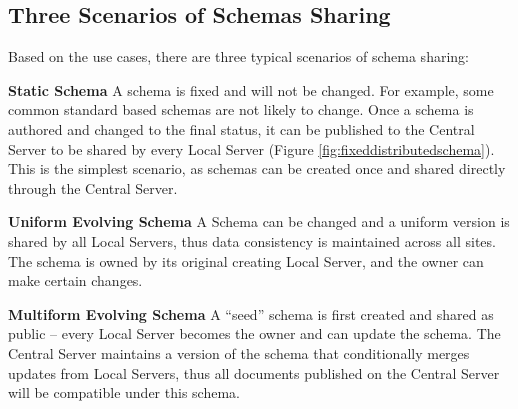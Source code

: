 \documentclass{doublecol-new}
\theoremstyle{TH}{
\newtheorem{lemma}{Lemma}
\newtheorem{theorem}[lemma]{Theorem}
\newtheorem{corrolary}[lemma]{Corrolary}
\newtheorem{conjecture}[lemma]{Conjecture}
\newtheorem{proposition}[lemma]{Proposition}
\newtheorem{claim}[lemma]{Claim}
\newtheorem{stheorem}[lemma]{Wrong Theorem}
\newtheorem{algorithm}{Algorithm}
}
\theoremstyle{THrm}{
\newtheorem{definition}{Definition}[section]
\newtheorem{question}{Question}[section]
\newtheorem{remark}{Remark}
\newtheorem{scheme}{Scheme}
}
\theoremstyle{THhit}{
\newtheorem{case}{Case}[section]
}
\begin{document}





\subsection{Three Scenarios of Schemas Sharing}


Based on the use cases, there are three typical scenarios of schema sharing:

\textbf{Static Schema} A schema is fixed and will not be changed.
For example, some common standard based schemas are not likely to
change. Once a schema is authored and changed to the final status,
it can be published to the Central Server to be shared by every
Local Server (Figure \ref{fig:fixeddistributedschema}). This is the
simplest scenario, as schemas can be created once and shared
directly through the Central Server.

\textbf{Uniform Evolving Schema} A Schema can be changed and a uniform
version is shared by all Local Servers, thus data consistency is maintained
across all sites.  The schema is owned by its original creating Local Server,
and the owner can make certain changes.


\textbf{Multiform Evolving Schema} A ``seed'' schema is first
created and shared as public -- every Local Server becomes the owner
and can update the schema. The Central Server maintains a version of
the schema that conditionally merges updates from Local Servers,
thus all documents published on the Central Server will be
compatible under this schema.



\end{document}
